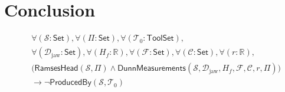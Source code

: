 \documentclass[12pt]{amsart}
\newcommand{\br}{,\allowbreak}
\newcommand{\R}{\mathbb{R}}
\begin{document}
\section{Conclusion}
\label{sec:conclusion}


\[
\begin{aligned}
& \forall (\mathcal{S} : \mathsf{Set}) \br  \forall (\Pi : \mathsf{Set}) \br  \forall (\mathcal{T}_0 : \mathsf{ToolSet}) \br  \\
& \forall (\mathcal{D}_{\text{jaw}} : \mathsf{Set}) \br  \forall (H_f : \R) \br  \forall (\mathcal{F} : \mathsf{Set}) \br  \forall (\mathcal{C} : \mathsf{Set}) \br  \forall (r : \R) \br  \\
& \bigl( \mathsf{RamsesHead}(\mathcal{S} \br \Pi) \land \mathsf{DunnMeasurements}(\mathcal{S} \br  \mathcal{D}_{\text{jaw}} \br  H_f \br  \mathcal{F} \br  \mathcal{C} \br  r \br  \Pi) \bigr) \\
& \rightarrow \neg \mathsf{ProducedBy}(\mathcal{S} \br \mathcal{T}_0)
\end{aligned}
\]
\end{document}
